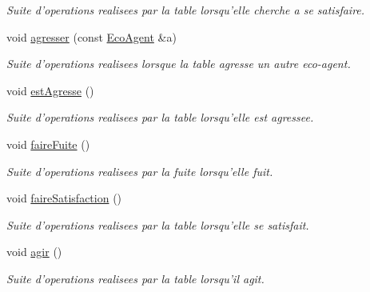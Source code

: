 \begin{CompactItemize}
\begin{CompactList}\small\item\em Suite d'operations realisees par la table lorsqu'elle cherche a se satisfaire. \item\end{CompactList}\item 
void \hyperlink{classTable_1aac4abcbb55e193e23a2e547c232273}{agresser} (const \hyperlink{classEcoAgent}{EcoAgent} \&a)
\begin{CompactList}\small\item\em Suite d'operations realisees lorsque la table agresse un autre eco-agent. \item\end{CompactList}\item 
\hypertarget{classTable_763c07c018021751ac161382c8469af1}{
void \hyperlink{classTable_763c07c018021751ac161382c8469af1}{estAgresse} ()}
\label{classTable_763c07c018021751ac161382c8469af1}

\begin{CompactList}\small\item\em Suite d'operations realisees par la table lorsqu'elle est agressee. \item\end{CompactList}\item 
\hypertarget{classTable_cefc0a468fbffa2273c0fbaf73589177}{
void \hyperlink{classTable_cefc0a468fbffa2273c0fbaf73589177}{faireFuite} ()}
\label{classTable_cefc0a468fbffa2273c0fbaf73589177}

\begin{CompactList}\small\item\em Suite d'operations realisees par la fuite lorsqu'elle fuit. \item\end{CompactList}\item 
\hypertarget{classTable_b442e96905d4a14e2eb1151eb6de5481}{
void \hyperlink{classTable_b442e96905d4a14e2eb1151eb6de5481}{faireSatisfaction} ()}
\label{classTable_b442e96905d4a14e2eb1151eb6de5481}

\begin{CompactList}\small\item\em Suite d'operations realisees par la table lorsqu'elle se satisfait. \item\end{CompactList}\item 
\hypertarget{classTable_314f12a86dbd1c133df83f33e2d92bec}{
void \hyperlink{classTable_314f12a86dbd1c133df83f33e2d92bec}{agir} ()}
\label{classTable_314f12a86dbd1c133df83f33e2d92bec}

\begin{CompactList}\small\item\em Suite d'operations realisees par la table lorsqu'il agit. \item\end{CompactList}\end{CompactItemize}


